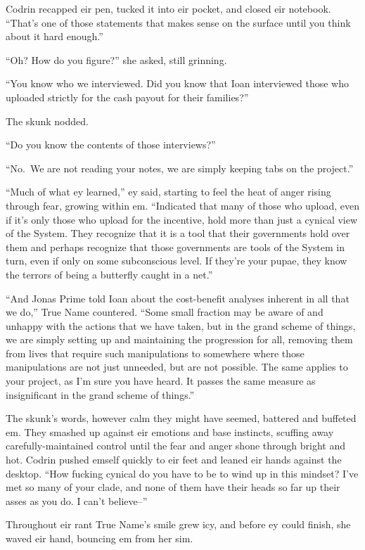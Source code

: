 Codrin recapped eir pen, tucked it into eir pocket, and closed eir notebook. ``That's one of those statements that makes sense on the surface until you think about it hard enough.''

``Oh? How do you figure?'' she asked, still grinning.

``You know who we interviewed. Did you know that Ioan interviewed those who uploaded strictly for the cash payout for their families?''

The skunk nodded.

``Do you know the contents of those interviews?''

``No.~We are not reading your notes, we are simply keeping tabs on the project.''

``Much of what ey learned,'' ey said, starting to feel the heat of anger rising through fear, growing within em. ``Indicated that many of those who upload, even if it's only those who upload for the incentive, hold more than just a cynical view of the System. They recognize that it is a tool that their governments hold over them and perhaps recognize that those governments are tools of the System in turn, even if only on some subconscious level. If they're your pupae, they know the terrors of being a butterfly caught in a net.''

``And Jonas Prime told Ioan about the cost-benefit analyses inherent in all that we do,'' True Name countered. ``Some small fraction may be aware of and unhappy with the actions that we have taken, but in the grand scheme of things, we are simply setting up and maintaining the progression for all, removing them from lives that require such manipulations to somewhere where those manipulations are not just unneeded, but are not possible. The same applies to your project, as I'm sure you have heard. It passes the same measure as insignificant in the grand scheme of things.''

The skunk's words, however calm they might have seemed, battered and buffeted em. They smashed up against eir emotions and base instincts, scuffing away carefully-maintained control until the fear and anger shone through bright and hot. Codrin pushed emself quickly to eir feet and leaned eir hands against the desktop. ``How fucking cynical do you have to be to wind up in this mindset? I've met so many of your clade, and none of them have their heads so far up their asses as you do. I can't believe--''

Throughout eir rant True Name's smile grew icy, and before ey could finish, she waved eir hand, bouncing em from her sim.

